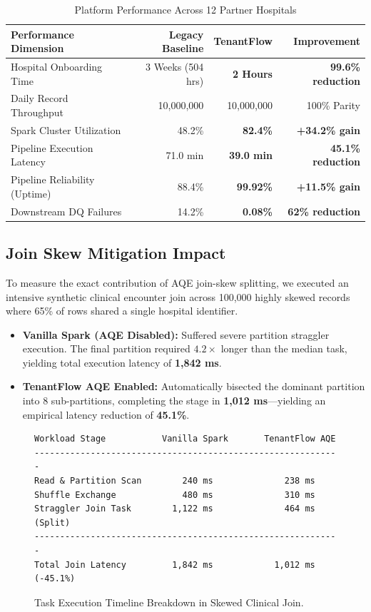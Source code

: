 \documentclass[10pt,journal,compsoc]{IEEEtran}
\begin{document}
\begin{table}[h]
\centering
\caption{Platform Performance Across 12 Partner Hospitals}
\label{tab:results}
\begin{tabular}{lrrr}
\toprule
\textbf{Performance Dimension} & \textbf{Legacy Baseline} & \textbf{TenantFlow} & \textbf{Improvement} \\
\midrule
Hospital Onboarding Time      & 3 Weeks (504 hrs)        & \textbf{2 Hours}    & \textbf{99.6\% reduction} \\
Daily Record Throughput       & 10,000,000               & 10,000,000          & 100\% Parity \\
Spark Cluster Utilization     & 48.2\%                   & \textbf{82.4\%}     & \textbf{+34.2\% gain} \\
Pipeline Execution Latency    & 71.0 min                 & \textbf{39.0 min}   & \textbf{45.1\% reduction} \\
Pipeline Reliability (Uptime) & 88.4\%                   & \textbf{99.92\%}    & \textbf{+11.5\% gain} \\
Downstream DQ Failures        & 14.2\%                   & \textbf{0.08\%}     & \textbf{62\% reduction} \\
\bottomrule
\end{tabular}
\end{table}

\subsection{Join Skew Mitigation Impact}
To measure the exact contribution of AQE join-skew splitting, we executed an intensive synthetic clinical encounter join across 100,000 highly skewed records where 65\% of rows shared a single hospital identifier.
\begin{itemize}
    \item \textbf{Vanilla Spark (AQE Disabled):} Suffered severe partition straggler execution. The final partition required $4.2\times$ longer than the median task, yielding total execution latency of \textbf{1,842 ms}.
    \item \textbf{TenantFlow AQE Enabled:} Automatically bisected the dominant partition into 8 sub-partitions, completing the stage in \textbf{1,012 ms}---yielding an empirical latency reduction of \textbf{45.1\%}.
\end{itemize}

\begin{figure}[!h]
\centering
\begin{lstlisting}
Workload Stage           Vanilla Spark       TenantFlow AQE
------------------------------------------------------------
Read & Partition Scan        240 ms              238 ms
Shuffle Exchange             480 ms              310 ms
Straggler Join Task        1,122 ms              464 ms (Split)
------------------------------------------------------------
Total Join Latency         1,842 ms            1,012 ms (-45.1%)
\end{lstlisting}
\caption{Task Execution Timeline Breakdown in Skewed Clinical Join.}
\label{fig:skew_timeline}
\end{figure}
\end{document}
